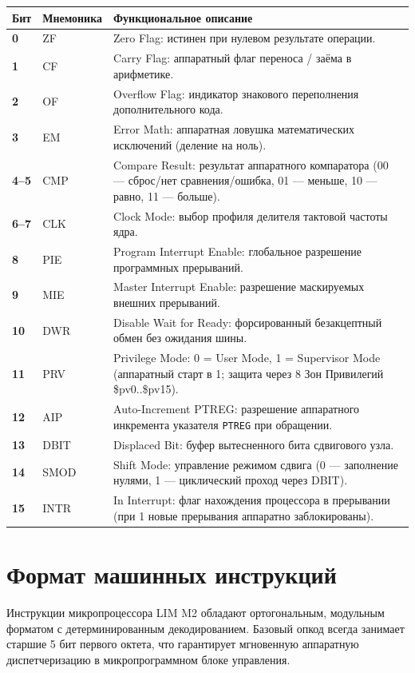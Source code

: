 \documentclass[11pt,a4paper]{article}
\newcommand{\reg}[1]{\texttt{#1}}
\begin{document}
\begin{tabularx}{\textwidth}{>{\bfseries}p{14mm}>{\ttfamily}p{23mm}X}
\toprule
Бит & Мнемоника & Функциональное описание \\
\midrule
0    & ZF   & Zero Flag: истинен при нулевом результате операции. \\
1    & CF   & Carry Flag: аппаратный флаг переноса / заёма в арифметике. \\
2    & OF   & Overflow Flag: индикатор знакового переполнения дополнительного кода. \\
3    & EM   & Error Math: аппаратная ловушка математических исключений (деление на ноль). \\
4--5 & CMP  & Compare Result: результат аппаратного компаратора (00 --- сброс/нет сравнения/ошибка, 01 --- меньше, 10 --- равно, 11 --- больше). \\
6--7 & CLK  & Clock Mode: выбор профиля делителя тактовой частоты ядра. \\
8    & PIE  & Program Interrupt Enable: глобальное разрешение программных прерываний. \\
9    & MIE  & Master Interrupt Enable: разрешение маскируемых внешних прерываний. \\
10   & DWR  & Disable Wait for Ready: форсированный безакцептный обмен без ожидания шины. \\
11   & PRV  & Privilege Mode: 0 = User Mode, 1 = Supervisor Mode (аппаратный старт в 1; защита через 8 Зон Привилегий \$pv0..\$pv15). \\
12   & AIP  & Auto-Increment PTREG: разрешение аппаратного инкремента указателя \reg{PTREG} при обращении. \\
13   & DBIT & Displaced Bit: буфер вытесненного бита сдвигового узла. \\
14   & SMOD & Shift Mode: управление режимом сдвига (0 --- заполнение нулями, 1 --- циклический проход через DBIT). \\
15   & INTR & In Interrupt: флаг нахождения процессора в прерывании (при 1 новые прерывания аппаратно заблокированы). \\
\bottomrule
\end{tabularx}

\section{Формат машинных инструкций}
Инструкции микропроцессора LIM M2 обладают ортогональным, модульным форматом с детерминированным декодированием. 
Базовый опкод всегда занимает старшие 5 бит первого октета, что гарантирует мгновенную аппаратную диспетчеризацию в микропрограммном блоке управления.
\end{document}
